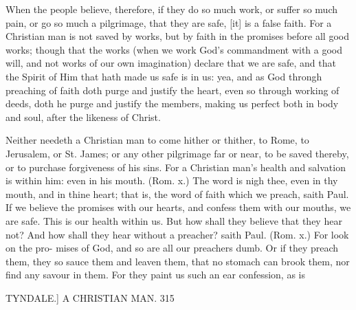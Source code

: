 \documentclass{custom}
\begin{document}
{When the people believe, therefore, if they do so 
much work, or suffer so much pain, or go so much a 
pilgrimage, that they are safe, [it] is a false faith. For a 
Christian man is not saved by works, but by faith in the 
promises before all good works; though that the works 
(when we work God's commandment with a good will, 
and not works of our own imagination) declare that we 
are safe, and that the Spirit of Him that hath made us 
safe is in us: yea, and as God throngh preaching of faith 
doth purge and justify the heart, even so through working 
of deeds, doth he purge and justify the members, making 
us perfect both in body and soul, after the likeness of 
Christ. 

Neither needeth a Christian man to come hither or 
thither, to Rome, to Jerusalem, or St. James; or any 
other pilgrimage far or near, to be saved thereby, or to 
purchase forgiveness of his sins. For a Christian man's 
health and salvation is within him: even in his mouth. 
(Rom. x.) The word is nigh thee, even in thy mouth, 
and in thine heart; that is, the word of faith which we 
preach, saith Paul. If we believe the promises with our 
hearts, and confess them with our mouths, we are safe. 
This is our health within us. But how shall they believe 
that they hear not? And how shall they hear without a 
preacher? saith Paul. (Rom. x.) For look on the pro- 
mises of God, and so are all our preachers dumb. Or 
if they preach them, they so sauce them and leaven them, 
that no stomach can brook them, nor find any savour in 
them. For they paint us such an ear confession, as is 


TYNDALE.]
A CHRISTIAN MAN.
315

}
\end{document}
